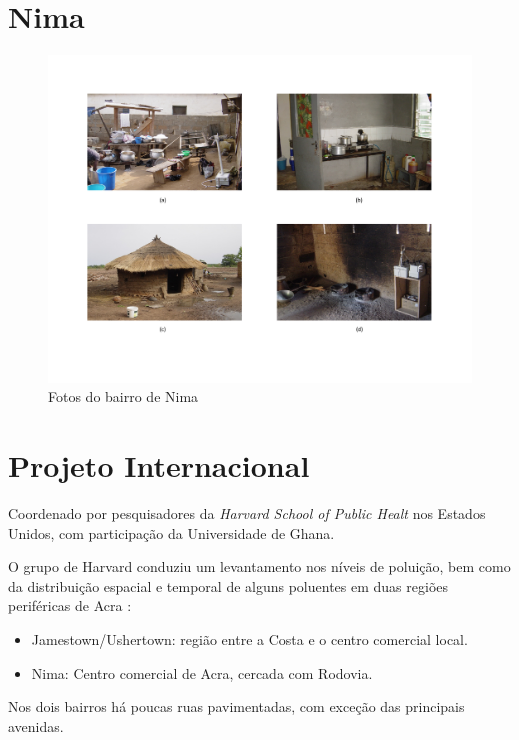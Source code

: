 \section{Nima}

\begin{figure}[H]
  \caption{Fotos do bairro de Nima}
  \includegraphics[scale=0.35]{../inputs/images/zheng/nima.pdf}
\end{figure}

\section{Projeto Internacional}

Coordenado por pesquisadores da \textit{Harvard School of Public Healt} nos 
Estados Unidos, com participação da Universidade de Ghana.

O grupo de Harvard \citep{ARKU2008} conduziu um levantamento nos níveis de 
poluição, bem como da distribuição espacial e temporal de alguns poluentes 
em duas regiões periféricas de Acra \citep{DIONISIO2010}:

\begin{itemize}
  \item Jamestown/Ushertown: região entre a Costa e o centro comercial local.
  \item Nima: Centro comercial de Acra, cercada com Rodovia.
\end{itemize} 

Nos dois bairros há poucas ruas pavimentadas, com exceção das principais 
avenidas. 
